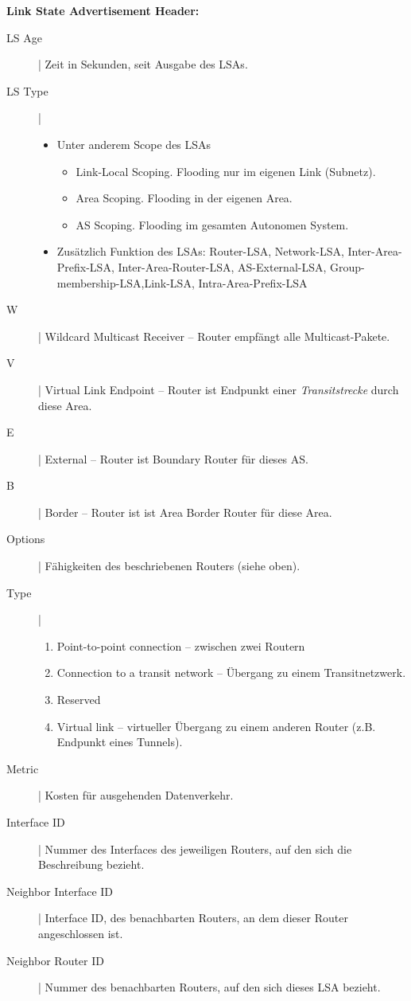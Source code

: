 \documentclass{article} %
\begin{document}
\textbf{Link State Advertisement Header:}
\begin{description}
	\item[LS Age] | Zeit in Sekunden, seit Ausgabe des LSAs.
	\item [LS Type] |
	\begin{itemize}
		\item  Unter anderem Scope des LSAs
	
	\begin{itemize}
		\item Link-Local Scoping. Flooding nur im eigenen Link (Subnetz).
		\item Area Scoping. Flooding in der eigenen Area.
		\item AS Scoping. Flooding im gesamten Autonomen System.
	\end{itemize}
	\item Zusätzlich Funktion des LSAs: 
	Router-LSA, Network-LSA, Inter-Area-Prefix-LSA, Inter-Area-Router-LSA, AS-External-LSA, Group-membership-LSA,Link-LSA, Intra-Area-Prefix-LSA
	\end{itemize}
	\item [W] | Wildcard Multicast Receiver – Router empfängt alle Multicast-Pakete.
	\item [V] | Virtual Link Endpoint – Router ist Endpunkt einer \emph{Transitstrecke} durch diese Area.
	\item [E] | External – Router ist Boundary Router für dieses AS.
	\item [B] | Border – Router ist ist Area Border Router für diese Area.
	\item [Options] | Fähigkeiten des beschriebenen Routers (siehe oben).
	\item [Type] | \begin{enumerate}
		\item Point-to-point connection – zwischen zwei Routern
		\item Connection to a transit network – Übergang zu einem Transitnetzwerk.
		\item Reserved
		\item Virtual link – virtueller Übergang zu einem anderen Router (z.B. Endpunkt eines Tunnels).
	\end{enumerate}

	\item [Metric] | Kosten für ausgehenden Datenverkehr.
	\item [Interface ID] | Nummer des Interfaces des jeweiligen Routers, auf den sich die Beschreibung bezieht.
	\item [Neighbor Interface ID] | Interface ID, des benachbarten Routers, an dem dieser Router angeschlossen ist.
	\item [Neighbor Router ID] | Nummer des benachbarten Routers, auf den sich dieses LSA bezieht.
\end{description}
\end{document}
